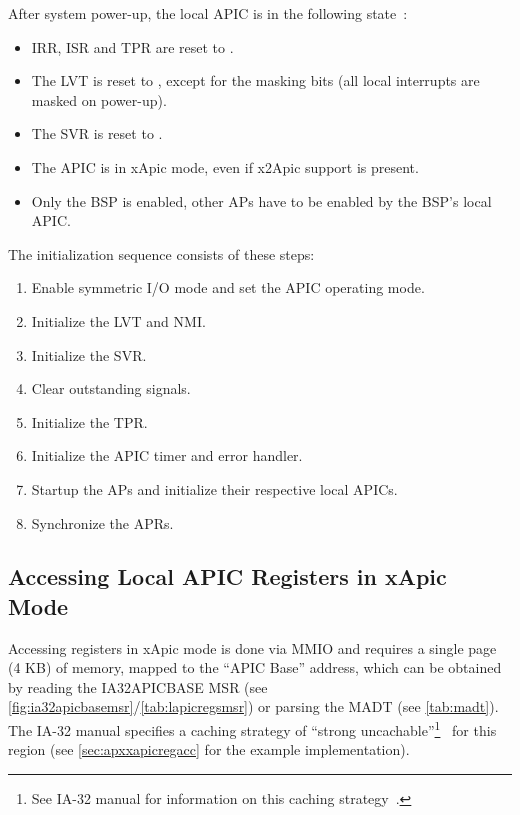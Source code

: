 After system power-up, the local APIC is in the following state~\cite[sec.~3.11.4.7]{ia32}:

\begin{itemize}
  \item IRR, ISR and TPR are reset to .
  \item The LVT is reset to , except for the masking bits (all local interrupts are masked
        on power-up).
  \item The SVR is reset to .
  \item The APIC is in xApic mode, even if x2Apic support is present.
  \item Only the BSP is enabled, other APs have to be enabled by the BSP's local APIC\@.
\end{itemize}

The initialization sequence consists of these steps:

\begin{enumerate}
  \item Enable symmetric I/O mode and set the APIC operating mode.
  \item Initialize the LVT and NMI\@.
  \item Initialize the SVR\@.
  \item Clear outstanding signals.
  \item Initialize the TPR\@.
  \item Initialize the APIC timer and error handler.
  \item Startup the APs and initialize their respective local APICs.
  \item Synchronize the APRs.
\end{enumerate}

\subsection{Accessing Local APIC Registers in xApic Mode}
\label{subsec:xapicregacc}

Accessing registers in xApic mode is done via MMIO and requires a single page (4 KB) of memory,
mapped to the ``APIC Base'' address, which can be obtained by reading the
IA32\textunderscore{}APIC\textunderscore{}BASE MSR (see
\autoref{fig:ia32apicbasemsr}/\autoref{tab:lapicregsmsr}) or parsing the MADT (see
\autoref{tab:madt}). The IA-32 manual specifies a caching strategy of ``strong
uncachable''\footnote{See IA-32 manual for information on this caching
  strategy~\cite[sec.~3.12.3]{ia32}.}~\cite[sec.~3.11.4.1]{ia32} for this region (see
\autoref{sec:apxxapicregacc} for the example implementation).

